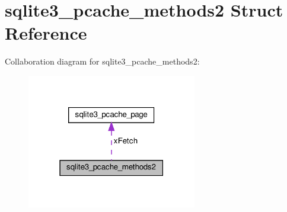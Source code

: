 \hypertarget{structsqlite3__pcache__methods2}{}\section{sqlite3\+\_\+pcache\+\_\+methods2 Struct Reference}
\label{structsqlite3__pcache__methods2}


Collaboration diagram for sqlite3\+\_\+pcache\+\_\+methods2\+:
\nopagebreak
\begin{figure}[H]
\begin{center}
\leavevmode
\includegraphics[width=210pt]{structsqlite3__pcache__methods2__coll__graph}
\end{center}
\end{figure}
